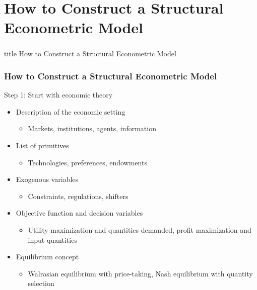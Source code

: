 \documentclass{beamer}
\begin{document}
\section{How to Construct a Structural Econometric Model}
\label{how}
\begin{frame}\frametitle{}
    \vfill
    \centering
    \begin{beamercolorbox}[center]{title}
        \Large How to Construct a Structural Econometric Model
    \end{beamercolorbox}
    \vfill
\end{frame}

\begin{frame}\frametitle{How to Construct a Structural Econometric Model}
    Step 1: Start with economic theory
    \begin{itemize}
        \item Description of the economic setting
        \begin{itemize}
            \item Markets, institutions, agents, information
        \end{itemize}
        \item List of primitives
        \begin{itemize}
            \item Technologies, preferences, endowments
        \end{itemize}
        \item Exogenous variables
        \begin{itemize}
            \item Constraints, regulations, shifters
        \end{itemize}
        \item Objective function and decision variables
        \begin{itemize}
            \item Utility maximization and quantities demanded, profit maximization and input quantities
        \end{itemize}
        \item Equilibrium concept
        \begin{itemize}
            \item Walrasian equilibrium with price-taking, Nash equilibrium with quantity selection
        \end{itemize}
    \end{itemize}
\end{frame}
\end{document}
